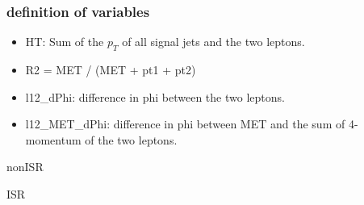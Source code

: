 \documentclass[mathserif,serif]{beamer}
\begin{document}
\begin{frame}
\frametitle{definition of variables}
\normalsize
\begin{itemize}
\item HT: Sum of the $p_T$ of all signal jets and the two leptons.
\item R2 = MET / (MET + pt1 + pt2)
\item l12\_dPhi: difference in phi between the two leptons.
\item l12\_MET\_dPhi: difference in phi between MET and the sum of 4-momentum of the two leptons.
\end{itemize}
\end{frame}

\begin{frame}
\begin{center}
\huge
nonISR
\end{center}
\end{frame}

\def \PathToPlot {../plot}


\begin{frame}
\begin{center}
\huge
ISR
\end{center}
\end{frame}

\def \PathToPlot {../plot}

\end{document}
